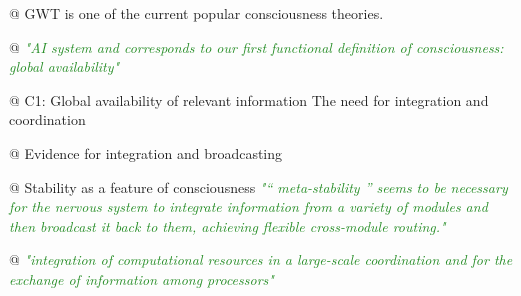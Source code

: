 \documentclass[utf8]{article}
\newenvironment{ants}
			{
			 \begin{easylist}[itemize]		
		 	}
			{
			\end{easylist}
			}
\newcommand{\rewrite}[1]{\textcolor{ForestGreen}{\textit{"#1"}}\newline}
\begin{document}
		
			\begin{ants}
				@ GWT is one of the current popular consciousness theories.
				
				@ \rewrite{AI system and corresponds to our first functional definition of consciousness: global availability} \cite{Dehaene2017}
				
				@ C1: Global availability of relevant information The need for integration and coordination \cite{Dehaene2017}
				
				@ Evidence for integration and broadcasting
				
				@ Stability as a feature of consciousness \rewrite{“ meta-stability ” seems to be necessary for the nervous system to integrate information from a variety of modules and then broadcast it back to them, achieving flexible cross-module routing.}
				
				@ \rewrite{integration of computational resources in a large-scale coordination and for the exchange of information among processors}
				

\end{ants}
\end{document}
